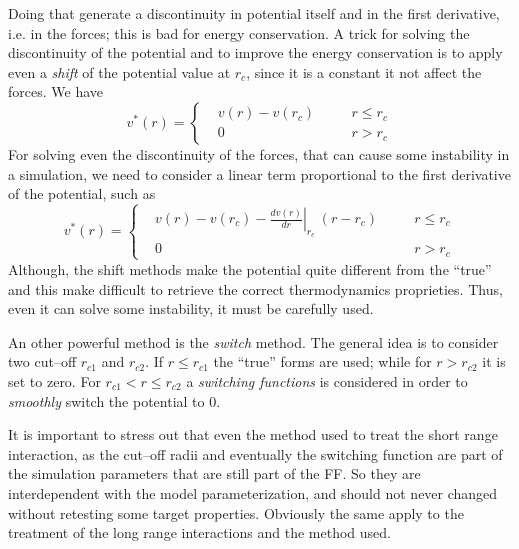 Doing that generate a discontinuity in potential itself and in the first derivative, i.e. in the forces; this is bad for energy conservation. A trick for solving the discontinuity of the potential and to improve the energy conservation is to apply even a \textit{shift} of the potential value at $r_c$, since it is a constant it not affect the forces. We have
\begin{equation*}
v^*(r) = \left \{
	\begin{aligned}
&v(r) - v(r_c) & \quad & r \le r_c \\
&0    & \quad  & r >   r_c
	\end{aligned} \right .
\end{equation*}
For solving even the discontinuity of the forces, that can cause some instability in a simulation, we need to consider a linear term proportional to the first derivative of the potential, such as
\begin{equation*}
v^*(r) = \left \{
	\begin{aligned}
&v(r) - v(r_c) - \left . \frac{dv(r)}{dr}\right |_{r_c}\ (r - r_c) & \quad & r \le r_c \\
&0    & \quad  & r >   r_c
	\end{aligned} \right .
\end{equation*}
Although, the shift methods make the potential quite different from the ``true'' and this make difficult to retrieve the correct thermodynamics proprieties. Thus, even it can solve some instability, it must be carefully used.

An other powerful method is the \textit{switch} method. The general idea is to consider two cut--off $r_{c1}$ and $r_{c2}$. If $r \le r_{c1}$ the ``true'' forms are used; while for $r > r_{c2}$ it is set to zero. For $r_{c1} < r \le r_{c2}$ a \textit{switching functions} is considered in order to \textit{smoothly} switch the potential to $0$.

It is important to stress out that even the method used to treat the short range interaction, as the cut--off radii and eventually the switching function are part of the simulation parameters that are still part of the \ac{FF}. So they are interdependent with the model parameterization, and should not never changed without retesting some target properties. Obviously the same apply to the treatment of the long range interactions and the method used.


